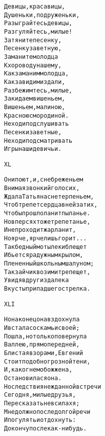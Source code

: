 \begin{minipage}[t]{\dimexpr 0.5\textwidth -\tabcolsep-.5pt}
\begin{alltt}\normalfont\centering
Девицы, красавицы,
Душеньки, подруженьки,
Разыграйтесь девицы,
Разгуляйтесь, милые!
Затяните песенку,
Песенку заветную,
Заманите молодца
К хороводу нашему,
Как заманим молодца,
Как завидим издали,
Разбежимтесь, милые,
Закидаем вишеньем,
Вишеньем, малиною,
Красною смородиной.
Не ходи подслушивать
Песенки заветные,
Не ходи подсматривать
Игры наши девичьи.
\end{alltt}
\end{minipage}

\begin{minipage}[t]{\dimexpr 0.5\textwidth -\tabcolsep-.5pt}
\begin{alltt}\normalfont\centering
XL

Они поют, и, с небреженьем
Внимая звонкий голос их,
Ждала Татьяна с нетерпеньем,
Чтоб трепет сердца в ней затих,
Чтобы прошло ланит пыланье.
Но в персях то же трепетанье,
И не проходит жар ланит,
Но ярче, ярче лишь горит...
Так бедный мотылек и блещет
И бьется радужным крылом,
Плененный школьным шалуном;
Так зайчик в озими трепещет,
Увидя вдруг издалека
В кусты припадшего стрелка.
\end{alltt}
\end{minipage}

\begin{minipage}[t]{\dimexpr 0.5\textwidth -\tabcolsep-.5pt}
\begin{alltt}\normalfont\centering
XLI

Но наконец она вздохнула
И встала со скамьи своей;
Пошла, но только повернула
В аллею, прямо перед ней,
Блистая взорами, Евгений
Стоит подобно грозной тени,
И, как огнем обожжена,
Остановилася она.
Но следствия нежданной встречи
Сегодня, милые друзья,
Пересказать не в силах я;
Мне должно после долгой речи
И погулять и отдохнуть:
Докончу после как-нибудь.
\end{alltt}
\end{minipage}
